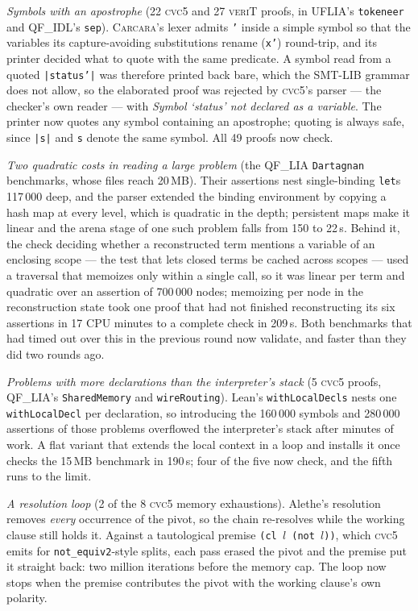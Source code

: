 \documentclass[runningheads]{llncs}
\newcommand{\cvcv}{\textsc{cvc5}\xspace}
\newcommand{\carcara}{\textsc{Carcara}\xspace}
\newcommand{\verit}{\textsc{veriT}\xspace}
\newcommand{\rulename}[1]{\texttt{#1}}
\begin{document}
\emph{Symbols with an apostrophe} (22 \cvcv and 27 \verit proofs, in UFLIA's
\texttt{tokeneer} and QF\_IDL's \texttt{sep}). \carcara's lexer admits
\texttt{'} inside a simple symbol so that the variables its
capture-avoiding substitutions rename (\texttt{x'}) round-trip, and its
printer decided what to quote with the same predicate. A symbol read from a
quoted \texttt{|status'|} was therefore printed back bare, which the SMT-LIB
grammar does not allow, so the elaborated proof was rejected by
\cvcv's parser --- the checker's own reader --- with \emph{Symbol `status' not
declared as a variable}. The printer now quotes any symbol containing an
apostrophe; quoting is always safe, since \texttt{|s|} and \texttt{s} denote
the same symbol. All 49 proofs now check.

\emph{Two quadratic costs in reading a large problem} (the QF\_LIA
\texttt{Dartagnan} benchmarks, whose files reach 20\,MB). Their assertions nest
single-binding \texttt{let}s 117\,000 deep, and the parser extended the binding
environment by copying a hash map at every level, which is quadratic in the
depth; persistent maps make it linear and the arena stage of one such problem
falls from 150 to 22\,s. Behind it, the check deciding whether a reconstructed
term mentions a variable of an enclosing scope --- the test that lets closed
terms be cached across scopes --- used a traversal that memoizes only within a
single call, so it was linear per term and quadratic over an assertion of
700\,000 nodes; memoizing per node in the reconstruction state took one proof
that had not finished reconstructing its six assertions in 17 CPU minutes to a
complete check in 209\,s. Both benchmarks that had timed out over this in the
previous round now validate, and faster than they did two rounds ago.

\emph{Problems with more declarations than the interpreter's stack}
(5 \cvcv proofs, QF\_LIA's \texttt{SharedMemory} and \texttt{wireRouting}).
Lean's \texttt{withLocalDecls} nests one \texttt{withLocalDecl} per
declaration, so introducing the 160\,000 symbols and 280\,000 assertions of
those problems overflowed the interpreter's stack after minutes of work. A
flat variant that extends the local context in a loop and installs it once
checks the 15\,MB benchmark in 190\,s; four of the five now check, and the
fifth runs to the limit.

\emph{A resolution loop} (2 of the 8 \cvcv memory exhaustions). Alethe's
resolution removes \emph{every} occurrence of the pivot, so the chain
re-resolves while the working clause still holds it. Against a tautological
premise \texttt{(cl $l$ (not $l$))}, which \cvcv emits for
\rulename{not\_equiv2}-style splits, each pass erased the pivot and the
premise put it straight back: two million iterations before the memory cap.
The loop now stops when the premise contributes the pivot with the working
clause's own polarity.
\end{document}
